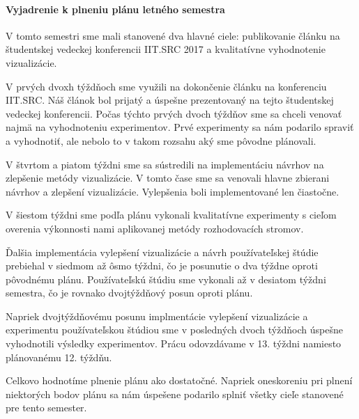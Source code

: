 \paragraph{Vyjadrenie k plneniu plánu letného semestra} V tomto semestri sme mali stanovené dva hlavné ciele: publikovanie článku na študentskej vedeckej konferencii IIT.SRC 2017 a kvalitatívne vyhodnotenie vizualizácie. 
\par
V prvých dvoxh týždňoch sme využili na dokončenie článku na konferenciu IIT.SRC. Náš článok bol prijatý a úspešne prezentovaný na tejto študentskej vedeckej konferencii. Počas týchto prvých dvoch týždňov sme sa chceli venovať najmä na vyhodnoteniu experimentov. Prvé experimenty sa nám podarilo spraviť a vyhodnotiť, ale nebolo to v takom rozsahu aký sme pôvodne plánovali.
\par
V štvrtom a piatom týždni sme sa sústredili na implementáciu návrhov na zlepšenie metódy vizualizácie. V tomto čase sme sa venovali hlavne zbierani návrhov a zlepšení vizualizácie. Vylepšenia boli implementované len čiastočne.
\par
V šiestom týždni sme podľa plánu vykonali kvalitatívne experimenty s cieľom overenia výkonnosti nami aplikovanej metódy rozhodovacích stromov.
\par
Ďalšia implementácia vylepšení vizualizácie a návrh používateľskej štúdie prebiehal v siedmom až ôsmo týždni, čo je posunutie o dva týždne oproti pôvodnému plánu. Používateľskú štúdiu sme vykonali až v desiatom týždni semestra, čo je rovnako dvojtýždňový posun oproti plánu.
\par
Napriek dvojtýždňovému posunu implmentácie vylepšení vizualizácie a experimentu používateľskou štúdiou sme v posledných dvoch týždňoch úspešne vyhodnotili výsledky experimentov. Prácu odovzdávame v 13. týždni namiesto plánovanému 12. týždňu.
\par
Celkovo hodnotíme plnenie plánu ako dostatočné. Napriek oneskoreniu pri plnení niektorých bodov plánu sa nám úspešene podarilo splniť všetky cieľe stanovené pre tento semester.




